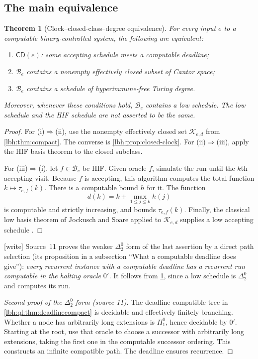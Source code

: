 \documentclass[11pt,letterpaper]{article}
\newtheorem{theorem}{Theorem}[section]
\theoremstyle{definition}
\theoremstyle{remark}
\newcommand{\Clock}{\mathsf{CD}}
\newcommand{\cK}{\mathcal K}
\newcommand{\cB}{\mathcal B}
\newcommand{\1}{\mathbf 1}
\newcommand{\wtag}{\textup{[write]}}%
\begin{document}
\subsection{The main equivalence}
\begin{theorem}[Clock--closed-class--degree equivalence]\label{lbh:thm:core}\label{lbh:ql:prop:oraclepath}
For every input $e$ to a computable binary-controlled system, the following
are equivalent:
\begin{enumerate}[label=\textnormal{(\roman*)}]
\item $\Clock(e)$: some accepting schedule meets a computable deadline;
\item $\cB_e$ contains a nonempty effectively closed subset of Cantor space;
\item $\cB_e$ contains a schedule of hyperimmune-free Turing degree.
\end{enumerate}
Moreover, whenever these conditions hold, $\cB_e$ contains a low schedule.
The low schedule and the HIF schedule are not asserted to be the same.
\end{theorem}
\begin{proof}
For (i)$\Rightarrow$(ii), use the nonempty effectively closed set
$\cK_{e,d}$ from \cref{lbh:thm:compact}. The converse is
\cref{lbh:prop:closed-clock}. For (ii)$\Rightarrow$(iii), apply the HIF basis
theorem to the closed subclass.

For (iii)$\Rightarrow$(i), let $f\in\cB_e$ be HIF. Given oracle $f$, simulate
the run until the $k$th accepting visit. Because $f$ is accepting, this
algorithm computes the total function $k\mapsto\tau_{e,f}(k)$.
There is a computable bound $h$ for it. The function
\begin{equation}\label{lbh:eq:strictify}
 d(k)=k+\max_{1\le j\le k}h(j)
\end{equation}
is computable and strictly increasing, and bounds $\tau_{e,f}(k)$.
Finally, the classical low basis theorem of Jockusch and Soare applied
to $\cK_{e,d}$ supplies a low accepting schedule \cite{js1972}.
\end{proof}
\wtag{} Source~11 proves the weaker $\Delta^0_2$ form of the last assertion by a direct path
selection (its proposition in a subsection ``What a computable deadline does give''):
\emph{every recurrent instance with a computable
deadline has a recurrent run computable in the halting oracle $0'$.} It follows from
\cref{lbh:thm:core}, since a low schedule is $\Delta^0_2$ and computes its run.
\begin{proof}[Second proof of the $\Delta^0_2$ form (source 11)]
The deadline-compatible tree in \cref{lbh:ql:thm:deadlinecompact} is decidable and
effectively finitely branching. Whether a node has arbitrarily long extensions
is $\Pi^0_1$, hence decidable by $0'$. Starting at the root, use that oracle to
choose a successor with arbitrarily long extensions, taking the first one in
the computable successor ordering. This constructs an infinite compatible
path. The deadline ensures recurrence.
\end{proof}
\end{document}
